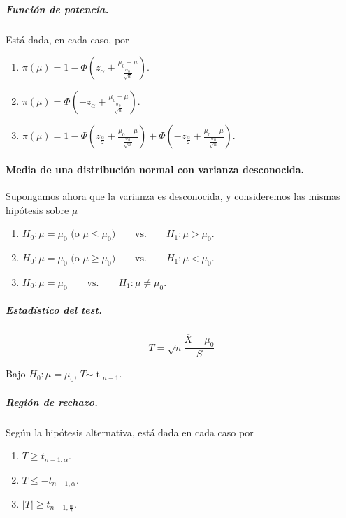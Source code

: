\documentclass[11pt]{article}
\theoremstyle{plain}
\theoremstyle{definition}
\theoremstyle{remark}
\newcommand{\dist}[1]{\ensuremath{\sim \operatorname{#1}}}  %
\begin{document}
          \subparagraph{Función de potencia.} Está dada, en cada caso, por
          \begin{enumerate}
            \item $\displaystyle \pi(\mu) = 1 - \Phi\left( z_\alpha + \frac{\mu_0 - \mu}{\frac{\sigma_0}{\sqrt{n}}} \right)$.
            \item $\displaystyle \pi(\mu) = \Phi\left( - z_\alpha + \frac{\mu_0 - \mu}{\frac{\sigma_0}{\sqrt{n}}} \right)$.
            \item $\displaystyle \pi(\mu) = 1 - \Phi\left( z_{\frac{\alpha}{2}} + \frac{\mu_0 - \mu}{\frac{\sigma_0}{\sqrt{n}}} \right) + \Phi\left( - z_{\frac{\alpha}{2}} + \frac{\mu_0 - \mu}{\frac{\sigma_0}{\sqrt{n}}} \right)$.
          \end{enumerate}

        \paragraph{Media de una distribución normal con varianza desconocida.}
          Supongamos ahora que la varianza es desconocida, y consideremos las mismas hipótesis sobre $\mu$
          \begin{enumerate}
            \item $ H_0 : \mu = \mu_0 \text{ (o $\mu \leq \mu_0$)} \qquad \text{vs.} \qquad H_1 : \mu > \mu_0 $.
            \item $ H_0 : \mu = \mu_0 \text{ (o $\mu \geq \mu_0$)} \qquad \text{vs.} \qquad H_1 : \mu < \mu_0 $.
            \item $ H_0 : \mu = \mu_0 \qquad \text{vs.} \qquad H_1 : \mu \neq \mu_0 $.
          \end{enumerate}

          \subparagraph{Estadístico del test.}
          \[ T = \sqrt{n} \frac{\overline{X} - \mu_0}{S} \]

          Bajo $H_0 : \mu = \mu_0$, $T \dist{t}_{n - 1}$.

          \subparagraph{Región de rechazo.} Según la hipótesis alternativa, está dada en cada caso por
          \begin{enumerate}
            \item $T \geq t_{n - 1,\alpha}$.
            \item $T \leq - t_{n - 1,\alpha}$.
            \item $\vert T \vert \geq t_{n - 1,\frac{\alpha}{2}}$.
          \end{enumerate}
\end{document}
